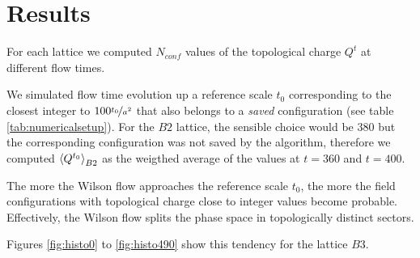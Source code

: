 \section{Results}
\label{sec:numerical results}
For each lattice we computed $N_{conf}$ values of the topological charge $Q^{t}$ at different flow times.

We simulated flow time evolution up a reference scale $t_{0}$ corresponding to the closest integer to
$100 \nicefrac{t_{0}}{a ^2}$ that also belongs to a \textit{saved} configuration (see table \ref{tab:numericalsetup}). For the $B2$ lattice,
the sensible choice would be $380$ but the corresponding configuration was not saved by the algorithm, therefore
we computed $\ev{Q^{t_{0}}}_{B2}$ as the weigthed average of the values at $t=360$ and $t=400$.

The more the Wilson flow approaches the reference scale $t_{0}$, the more the field configurations with
topological charge close to integer values become probable. Effectively, the Wilson flow splits the phase space in topologically
distinct sectors.

Figures \ref{fig:histo0} to \ref{fig:histo490} show this tendency for the lattice $B3$.


